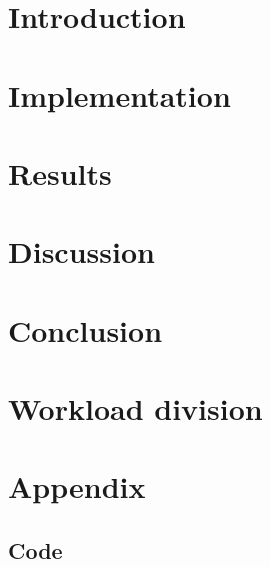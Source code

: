 \documentclass[twoside]{article}
\newcommand\matlabstyle{\lstset{language=Matlab,
   keywords={function,uint8,uint16,uint32,double,break,case,catch,continue,else,elseif,end,for,global,if,otherwise,persistent,return,switch,try,while},
   basicstyle=\ttfamily\footnotesize,
   breaklines=true,
   keywordstyle=\bfseries\color{Blue},
   commentstyle=\itshape\color{LightGray},
   stringstyle=\color{Green},
   numbers=left,
   numberstyle=\tiny\color{DarkGray},
   stepnumber=1,
   numbersep=10pt,
   backgroundcolor=\color{white},
   tabsize=2,
   showspaces=false,
   showstringspaces=false,
   captionpos=b}}
\newcommand\matlabexternal[2][]{{
\matlabstyle
}}
\begin{document}
\begin{multicols}{2} %
\section{Introduction}
\label{sec:intro}


\section{Implementation}
\label{sec:implementation}


\section{Results}
\label{sec:results}


\section{Discussion}
\label{sec:discussion}


\section{Conclusion}
\label{sec:conclusion}


\section{Workload division}
\label{sec:workload}






\end{multicols}
\clearpage
\section*{Appendix}
\begin{appendices}
   \appendix
   \section{Code}
   \label{app:code}
\end{appendices}
\end{document}
